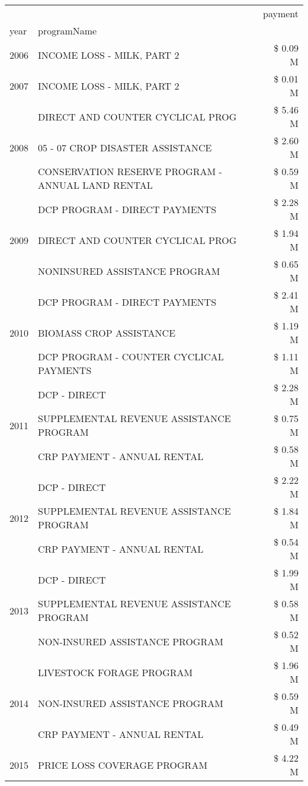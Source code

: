 \begin{tabular}{llr}
\toprule
 &  & payment \\
year & programName &  \\
\midrule
2006 & INCOME LOSS - MILK, PART 2 & \$ 0.09 M \\
\cline{1-3}
2007 & INCOME LOSS - MILK, PART 2 & \$ 0.01 M \\
\cline{1-3}
\multirow[t]{3}{*}{2008} & DIRECT AND COUNTER CYCLICAL PROG & \$ 5.46 M \\
 & 05 - 07 CROP DISASTER ASSISTANCE & \$ 2.60 M \\
 & CONSERVATION RESERVE PROGRAM - ANNUAL LAND RENTAL & \$ 0.59 M \\
\cline{1-3}
\multirow[t]{3}{*}{2009} & DCP PROGRAM - DIRECT PAYMENTS & \$ 2.28 M \\
 & DIRECT AND COUNTER CYCLICAL PROG & \$ 1.94 M \\
 & NONINSURED ASSISTANCE PROGRAM & \$ 0.65 M \\
\cline{1-3}
\multirow[t]{3}{*}{2010} & DCP PROGRAM - DIRECT PAYMENTS & \$ 2.41 M \\
 & BIOMASS CROP ASSISTANCE & \$ 1.19 M \\
 & DCP PROGRAM - COUNTER CYCLICAL PAYMENTS & \$ 1.11 M \\
\cline{1-3}
\multirow[t]{3}{*}{2011} & DCP - DIRECT & \$ 2.28 M \\
 & SUPPLEMENTAL REVENUE ASSISTANCE PROGRAM & \$ 0.75 M \\
 & CRP PAYMENT - ANNUAL RENTAL & \$ 0.58 M \\
\cline{1-3}
\multirow[t]{3}{*}{2012} & DCP - DIRECT & \$ 2.22 M \\
 & SUPPLEMENTAL REVENUE ASSISTANCE PROGRAM & \$ 1.84 M \\
 & CRP PAYMENT - ANNUAL RENTAL & \$ 0.54 M \\
\cline{1-3}
\multirow[t]{3}{*}{2013} & DCP - DIRECT & \$ 1.99 M \\
 & SUPPLEMENTAL REVENUE ASSISTANCE PROGRAM & \$ 0.58 M \\
 & NON-INSURED ASSISTANCE PROGRAM & \$ 0.52 M \\
\cline{1-3}
\multirow[t]{3}{*}{2014} & LIVESTOCK FORAGE PROGRAM & \$ 1.96 M \\
 & NON-INSURED ASSISTANCE PROGRAM & \$ 0.59 M \\
 & CRP PAYMENT - ANNUAL RENTAL & \$ 0.49 M \\
\cline{1-3}
\multirow[t]{3}{*}{2015} & PRICE LOSS COVERAGE PROGRAM & \$ 4.22 M \\

\end{tabular}
